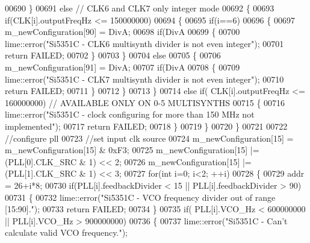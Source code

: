 \begin{DoxyCode}
{{00690         \}
00691         \textcolor{keywordflow}{else} \textcolor{comment}{// CLK6 and CLK7 only integer mode}
00692         \{
00693             \textcolor{keywordflow}{if}(CLK[i].outputFreqHz <= 150000000)
00694             \{
00695                 \textcolor{keywordflow}{if}(i==6)
00696                 \{
00697                     m\_newConfiguration[90] = DivA;
00698                     \textcolor{keywordflow}{if}(DivA%
00699                     \{
00700                         lime::error(\textcolor{stringliteral}{"Si5351C - CLK6 multisynth divider is not even integer"});
00701                         \textcolor{keywordflow}{return} FAILED;
00702                     \}
00703                 \}
00704                 \textcolor{keywordflow}{else}
00705                 \{
00706                     m\_newConfiguration[91] = DivA;
00707                     \textcolor{keywordflow}{if}(DivA%
00708                     \{
00709                         lime::error(\textcolor{stringliteral}{"Si5351C - CLK7 multisynth divider is not even integer"});
00710                         \textcolor{keywordflow}{return} FAILED;
00711                     \}
00712                 \}
00713             \}
00714             \textcolor{keywordflow}{else} \textcolor{keywordflow}{if}( CLK[i].outputFreqHz <= 160000000) \textcolor{comment}{// AVAILABLE ONLY ON 0-5 MULTISYNTHS}
00715             \{
00716                 lime::error(\textcolor{stringliteral}{"Si5351C - clock configuring for more than 150 MHz not implemented"});
00717                 \textcolor{keywordflow}{return} FAILED;
00718             \}
00719         \}
00720     \}
00721 
00722     \textcolor{comment}{//configure pll}
00723     \textcolor{comment}{//set input clk source}
00724     m\_newConfiguration[15] = m\_newConfiguration[15] & 0xF3;
00725     m\_newConfiguration[15] |= (PLL[0].CLK\_SRC & 1) << 2;
00726     m\_newConfiguration[15] |= (PLL[1].CLK\_SRC & 1) << 3;
00727     \textcolor{keywordflow}{for}(\textcolor{keywordtype}{int} i=0; i<2; ++i)
00728     \{
00729         addr = 26+i*8;
00730         \textcolor{keywordflow}{if}(PLL[i].feedbackDivider < 15 || PLL[i].feedbackDivider > 90)
00731         \{
00732             lime::error(\textcolor{stringliteral}{"Si5351C - VCO frequency divider out of range [15:90]."});
00733             \textcolor{keywordflow}{return} FAILED;
00734         \}
00735         \textcolor{keywordflow}{if}( PLL[i].VCO\_Hz < 600000000 || PLL[i].VCO\_Hz > 900000000)
00736         \{
00737             lime::error(\textcolor{stringliteral}{"Si5351C - Can't calculate valid VCO frequency."});
}}
\end{DoxyCode}

